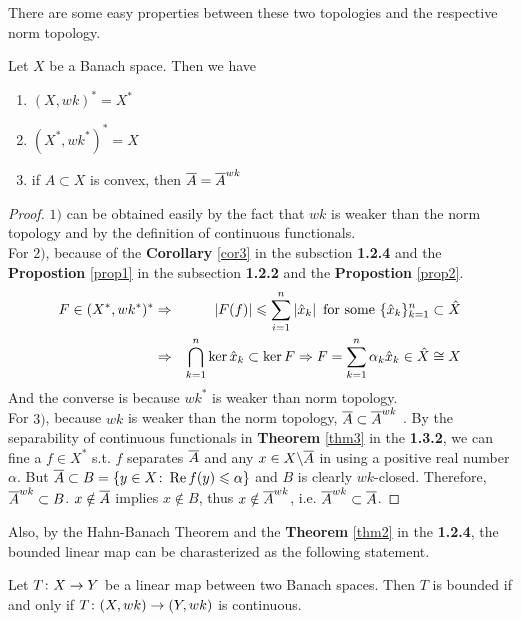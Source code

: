 \documentclass[a4paper,11pt]{report}
\begin{document}
There are some easy properties between these two topologies and the respective norm topology.
\begin{prop}
	Let $X$ be a Banach space. Then we have
	\begin{enumerate}[label=\arabic*)]
		\item $(X,wk)^{*} = X^{*}$
		\item $(X^{*},wk^{*})^{*} = X$
		\item if $A \subset X$ is convex, then $\overline{A}=\overline{A}^{wk}$
	\end{enumerate}
\end{prop}
\begin{proof}
	$1)$ can be obtained easily by the fact that $wk$ is weaker than the norm topology and by the definition of continuous functionals.\\
	For $2)$, because of the \textbf{Corollary} \ref{cor3} in the subsction \textbf{1.2.4} and the \textbf{Propostion} \ref{prop1} in the subsection \textbf{1.2.2} and the \textbf{Propostion} \ref{prop2}. 
	\begin{eqnarray*}
		F \in (X^{*},wk^{*})^{*} &\Rightarrow& \left\lvert F(f)\right\lvert \leqslant \sum_{i=1}^{n} \left\lvert\hat{x}_k\right\lvert \text{ for some } \{\hat{x}_k\}_{k=1}^{n} \subset \hat{X} \\
		&\Rightarrow& \bigcap_{k=1}^{n}\ker{\hat{x}_k} \subset \ker{F} \Rightarrow F = \sum_{k=1}^{n} \alpha_k \hat{x}_k \in \hat{X} \cong X
	\end{eqnarray*}
	And the converse is because $wk^{*}$ is weaker than norm topology.\\
	For $3)$, because $wk$ is weaker than the norm topology, $\overline{A} \subset \overline{A}^{wk}$ . By the separability of continuous functionals in \textbf{Theorem} \ref{thm3} in the \textbf{1.3.2}, we can fine a $f \in X^{*}$ s.t. $f$ separates $\overline{A}$ and any $x \in X \backslash \overline{A}$ in using a positive real number $\alpha$. But $\overline{A} \subset B=\{y \in X \colon \operatorname{Re}{f(y)} \leqslant \alpha\}$ and $B$ is clearly $wk$-closed. Therefore, $\overline{A}^{wk} \subset B$. $x \notin \overline{A}$ implies $x \notin B$, thus $x \notin \overline{A}^{wk}$, i.e. $\overline{A}^{wk} \subset \overline{A}$.
\end{proof}

Also, by the Hahn-Banach Theorem and the \textbf{Theorem} \ref{thm2} in the \textbf{1.2.4}, the bounded linear map can be charasterized as the following statement.
\begin{prop}
	Let $T \colon X \rightarrow Y$ be a linear map between two Banach spaces. Then $T$ is bounded if and only if $T \colon (X,wk) \rightarrow (Y,wk)$ is continuous.
\end{prop}
 
\end{document}
